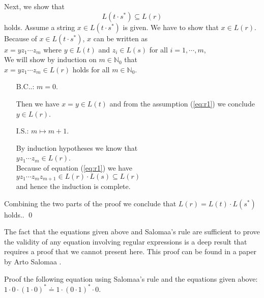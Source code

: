 Next, we show that
\begin{equation}
  \label{eq:r4}
  L(t \cdot s^*) \subseteq L(r)
\end{equation}
holds.  Assume  a string  $x \in L(t \cdot s^*)$ is given.  We have to show that 
$x \in L(r)$.  Because of  $x \in L(t \cdot s^*)$,  $x$ can be written as
\\[0.2cm]
\hspace*{1.3cm}
$x = y z_1 \cdots z_m$ \quad where $y \in L(t)$ and $z_i \in L(s)$ for all $i=1,\cdots,m$,
\\[0.2cm]
We will show by induction on  $m \in \mathbb{N}_0$ that
\\[0.2cm]
\hspace*{1.3cm}
$x = y z_1 \cdots z_m \in L(r)$ \quad holds for all $m \in \mathbb{N}_0$.
\begin{enumerate}
\item[B.C..:] $m= 0$.

             Then we have $x = y \in L(t)$ and from the assumption (\ref{eq:r1}) we conclude
             $y \in L(r)$.
\item[I.S.:] $m \mapsto m + 1$.

             By induction hypotheses we know that
             \\[0.2cm]
             \hspace*{1.3cm}
             $y z_1 \cdots z_m \in L(r)$.
             \\[0.2cm]
             Because of equation (\ref{eq:r1}) we have
             \\[0.2cm]
             \hspace*{1.3cm}
             $y z_1 \cdots z_m z_{m+1} \in L(r) \cdot L(s) \subseteq L(r)$
             \\[0.2cm]
             and hence the induction is complete.
\end{enumerate}
Combining the two parts of the proof we conclude that  $L(r) = L(t) \cdot L(s^*)$ holds..
\qed



\remark
The fact that the equations given above and Salomaa's rule are sufficient to prove the validity of
any equation involving regular expressions is a deep result that requires a proof that we cannot
present here.  This proof can be found in a paper by Arto Salomaa \cite{salomaa:66}.

\exerciseEng
Proof the following equation using Salomaa's rule and the equations given above:
\\[0.2cm]
\hspace*{1.3cm}
$1 \cdot 0 \cdot (1 \cdot 0)^* \doteq  1 \cdot (0 \cdot 1)^* \cdot 0$.
\vspace*{0.1cm}


